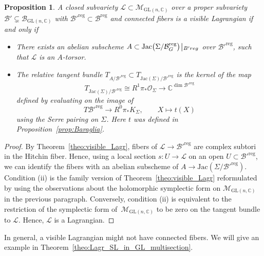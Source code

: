 \documentclass[10pt,a4paper]{amsart}
\numberwithin{equation}{section}
\newtheorem{prop}[theo]{Proposition}
\theoremstyle{definition}
\newcommand{\reg}{\mathrm{reg}}
\newcommand{\Jac}{\mathrm{Jac}}
\newcommand{\rest}{\: \rule[-3.5pt]{0.5pt}{11.5pt}\,{}}
\renewcommand{\to}{\rightarrow}
\newcommand{\calB}{\mathcal{B}}
\newcommand{\calL}{\mathcal{L}}
\newcommand{\calM}{\mathcal{M}}
\newcommand{\calO}{\mathcal{O}}
\newcommand{\CC}{\mathbb{C}}
\newcommand{\GL}{\mathrm{GL}}
\begin{document}
\begin{prop}\label{prop:criterion} A closed subvariety $\calL \subset \calM_{\GL(n,\CC)}$ over a proper subvariety $\calB' \subsetneq \calB_{\GL(n,\CC)}$ with $\calB'^\reg \subset \calB^\reg$ and connected fibers is a visible Lagrangian if and only if
 \begin{itemize}\itemsep=0pt
 \item[$(i)$] There exists an abelian subscheme $A \subset \Jac\bigl(\Sigma/\calB_G^\reg\bigr) \rest_{B'^\reg}$ over $\calB'^\reg$, such that $\calL$ is an $A$-torsor.
 \item[$(ii)$] The relative tangent bundle $T_{A/\calB'^\reg} \subset T_{\Jac(\Sigma)/\calB'^\reg}$ is the kernel of the map
 \[ T_{\Jac(\Sigma)/\calB'^\reg} \cong R^1\pi_*\calO_\Sigma \to \CC^{\dim \calB'^\reg}
 \]
 defined by evaluating on the image of
 \[ T\calB'^\reg \to R^0\pi_*K_\Sigma, \qquad X \mapsto t(X)
 \]
 using the Serre pairing on $\Sigma$. Here $t$ was defined in Proposition~{\rm \ref{prop:Baraglia}}.
 \end{itemize}
\end{prop}

\begin{proof} By Theorem~\ref{theo:visible_Lagr}, fibers of $\calL \to \calB'^\reg$ are complex subtori in the Hitchin fiber. Hence, using a local section $s\colon U \to \calL$ on an open $U \subset \calB'^\reg$, we can identify the fibers with an abelian subscheme of $A \to \Jac(\Sigma/\calB'^\reg)$. Condition (ii) is the family version of Theorem~\ref{theo:visible_Lagr} reformulated by using the observations about the holomorphic symplectic form on $\calM_{\GL(n,\CC)}$ in the previous paragraph. Conversely, condition (ii) is equivalent to the restriction of the symplectic form of~$\calM_{\GL(n,\CC)}$ to be zero on the tangent bundle to $\calL$. Hence, $\calL$ is a Lagrangian.
\end{proof}

In general, a visible Lagrangian might not have connected fibers. We will give an example in Theorem~\ref{theo:Lagr_SL_in_GL_multisection}.
\end{document}
